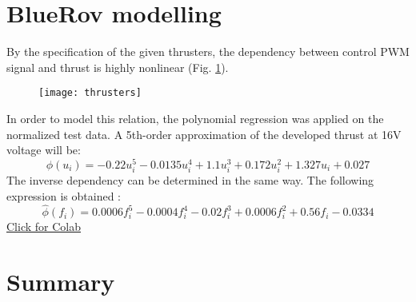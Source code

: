 \section{BlueRov modelling }


    By the specification of the given thrusters, the dependency between control 
    PWM signal and thrust is highly nonlinear (Fig. \ref{image:thrust}).
    \begin{figure}[H]
        \centering\texttt{[image: thrusters]}
        \caption{}
        \label{image:thrust}
    \end{figure}
    In order to model this relation, the polynomial regression was applied on the normalized test data. 
    A 5th-order approximation of the developed thrust at 16V voltage will be:
    $$
    \phi(u_i) = - 0.22 u_i^5
    - 0.0135 u_i^4
    + 1.1 u_i^3
    + 0.172 u_i^2
    + 1.327 u_i 
    + 0.027
    $$
    The inverse dependency can be determined in the same way. 
    The following expression is obtained :
    $$
    \hat{\phi}(f_i) = 0.0006 f_i^5 
    - 0.0004 f_i^4 
    - 0.02 f_i^3
    + 0.0006 f_i^2 
    + 0.56 f_i
    -0.0334
    $$
    \href{https://colab.research.google.com/drive/1XaNNENZPk88yaddOYy01vXtHd8_YwT2m?usp=sharing}{Click for Colab}

\section{Summary}

